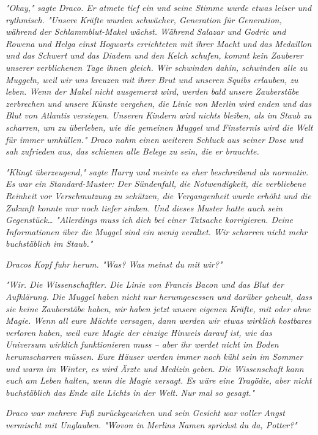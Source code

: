 {\emph{"Okay," sagte Draco. Er atmete tief ein und seine Stimme wurde etwas leiser und rythmisch. "Unsere Kräfte wurden schwächer, Generation für Generation, während der Schlammblut-Makel wächst. Während Salazar und Godric und Rowena und Helga einst Hogwarts errichteten mit ihrer Macht und das Medaillon und das Schwert und das Diadem und den Kelch schufen, kommt kein Zauberer unserer verblichenen Tage ihnen gleich. Wir schwinden dahin, schwinden alle zu Muggeln, weil wir uns kreuzen mit ihrer Brut und unseren Squibs erlauben, zu leben. Wenn der Makel nicht ausgemerzt wird, werden bald unsere Zauberstäbe zerbrechen und unsere Künste vergehen, die Linie von Merlin wird enden und das Blut von Atlantis versiegen. Unseren Kindern wird nichts bleiben, als im Staub zu scharren, um zu überleben, wie die gemeinen Muggel und Finsternis wird die Welt für immer umhüllen." Draco nahm einen weiteren Schluck aus seiner Dose und sah zufrieden aus, das schienen alle Belege zu sein, die er brauchte.}

\emph{"Klingt überzeugend," sagte Harry und meinte es eher beschreibend als normativ. Es war ein Standard-Muster: Der Sündenfall, die Notwendigkeit, die verbliebene Reinheit vor Verschmutzung zu schützen, die Vergangenheit wurde erhöht und die Zukunft konnte nur noch tiefer} \emph{sinken. Und dieses Muster hatte auch sein} \emph{\emph{Gegenstück…}} \emph{"Allerdings muss ich dich bei einer Tatsache korrigieren. Deine Informationen über die Muggel sind ein wenig veraltet. Wir scharren nicht mehr buchstäblich im Staub."}

\emph{Dracos Kopf fuhr herum. "\emph{Was?}} \emph{Was meinst du mit} \emph{\emph{wir?}"}

\emph{"Wir. Die Wissenschaftler. Die Linie von Francis Bacon und das Blut der Aufklärung. Die Muggel haben nicht nur herumgesessen und darüber geheult, dass sie keine Zauberstäbe haben, wir haben jetzt unsere} \emph{\emph{eigenen}} \emph{Kräfte, mit oder ohne Magie. Wenn all eure Mächte versagen, dann werden wir etwas wirklich kostbares verloren haben, weil eure Magie der einzige Hinweis darauf ist, wie das Universum} \emph{\emph{wirklich}} \emph{funktionieren muss -- aber ihr werdet nicht im Boden herumscharren müssen. Eure Häuser werden immer noch kühl sein im Sommer und warm im Winter, es wird Ärzte und Medizin geben. Die Wissenschaft kann euch am Leben halten, wenn die Magie versagt. Es wäre eine Tragödie, aber nicht buchstäblich das Ende alle Lichts in der Welt. Nur mal so gesagt."}

\emph{Draco war mehrere Fuß zurückgewichen und sein Gesicht war voller Angst vermischt mit Unglauben. "\emph{Wovon in Merlins Namen sprichst du da, Potter?}"}

}
